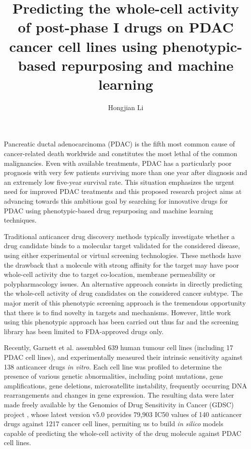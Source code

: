 \documentclass[a4paper,11pt]{article}
\title{Predicting the whole-cell activity of post-phase I drugs on PDAC cancer cell lines using phenotypic-based repurposing and machine learning}
\author[ ]{Hongjian Li}
\affil[ ]{Department of Computer Science and Engineering, Chinese University of Hong Kong}
\affil[ ]{hjli@cse.cuhk.edu.hk}
\begin{document}
\date{}
\maketitle

Pancreatic ductal adenocarcinoma (PDAC) is the fifth most common cause of cancer-related death worldwide and constitutes the most lethal of the common malignancies. Even with available treatments, PDAC has a particularly poor prognosis with very few patients surviving more than one year after diagnosis and an extremely low five-year survival rate. This situation emphasizes the urgent need for improved PDAC treatments and this proposed research project aims at advancing towards this ambitious goal by searching for innovative drugs for PDAC using phenotypic-based drug repurposing and machine learning techniques.

Traditional anticancer drug discovery methods typically investigate whether a drug candidate binds to a molecular target validated for the considered disease, using either experimental or virtual screening technologies. These methods have the drawback that a molecule with strong affinity for the target may have poor whole-cell activity due to target co-location, membrane permeability or polypharmacology issues. An alternative approach consists in directly predicting the whole-cell activity of drug candidates on the considered cancer subtype. The major merit of this phenotypic screening approach is the tremendous opportunity that there is to find novelty in targets and mechanisms. However, little work using this phenotypic approach has been carried out thus far and the screening library has been limited to FDA-approved drugs only.

Recently, Garnett et al. \cite{1683} assembled 639 human tumour cell lines (including 17 PDAC cell lines), and experimentally measured their intrinsic sensitivity against 138 anticancer drugs \textit{in vitro}. Each cell line was profiled to determine the presence of various genetic abnormalities, including point mutations, gene amplifications, gene deletions, microsatellite instability, frequently occurring DNA rearrangements and changes in gene expression. The resulting data were later made freely available by the Genomics of Drug Sensitivity in Cancer (GDSC) project \cite{1684}, whose latest version v5.0 provides 79,903 IC50 values of 140 anticancer drugs against 1217 cancer cell lines, permiting us to build \textit{in silico} models capable of predicting the whole-cell activity of the drug molecule against PDAC cell lines.
\end{document}
